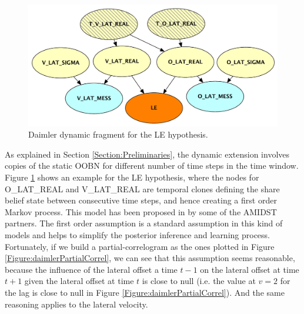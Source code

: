 \begin{figure}
\begin{center}
\includegraphics[scale=0.58]{./figures/DaimlerLEdyn}
\end{center}
\caption{\label{Figure:daimlerLEdyn}Daimler dynamic fragment for the LE hypothesis.}
\end{figure}

As explained in Section \ref{Section:Preliminaries}, the dynamic extension involves copies of the static OOBN for different number of time steps in the time window. Figure \ref{Figure:daimlerLEdyn} shows an example for the LE hypothesis, where the nodes for O\_LAT\_REAL and V\_LAT\_REAL are temporal clones defining the share belief state between consecutive time steps, and hence creating a first order Markov process. This model has been proposed in \cite{Weidl2014} by some of the AMIDST partners.  The first order assumption is a standard assumption in this kind of models and helps to simplify the posterior inference and learning process. Fortunately, if we build a partial-correlogram as the ones plotted in Figure \ref{Figure:daimlerPartialCorrel}, we can see that this assumption seems reasonable, because the influence of the lateral offset a time $t-1$ on the lateral offset at time $t+1$ given the lateral offset at time $t$ is close to null (i.e. the value at $v=2$ for the lag is close to null in Figure \ref{Figure:daimlerPartialCorrel}). And the same reasoning applies to the lateral velocity.


